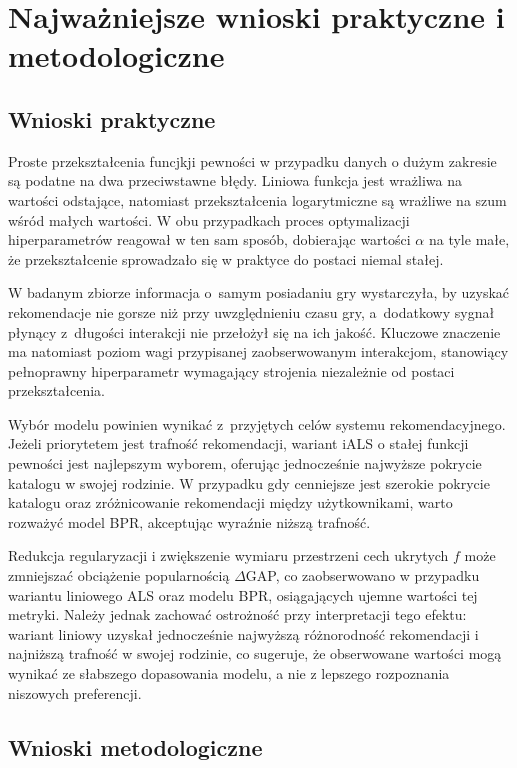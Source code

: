 \section{Najważniejsze wnioski praktyczne i metodologiczne}

\subsection{Wnioski praktyczne}

Proste przekształcenia funcjkji pewności w przypadku danych o dużym zakresie są podatne na dwa przeciwstawne błędy. Liniowa funkcja jest wrażliwa na wartości odstające, natomiast przekształcenia logarytmiczne są wrażliwe na szum wśród małych wartości. W obu przypadkach proces optymalizacji hiperparametrów reagował w ten sam sposób, dobierając wartości $\alpha$ na tyle małe, że przekształcenie sprowadzało się w praktyce do postaci niemal stałej.

W badanym zbiorze informacja o~samym posiadaniu gry wystarczyła, by uzyskać rekomendacje nie gorsze niż przy uwzględnieniu czasu gry, a~dodatkowy sygnał płynący z~długości interakcji nie przełożył się na ich jakość. Kluczowe znaczenie ma natomiast poziom wagi przypisanej zaobserwowanym interakcjom, stanowiący pełnoprawny hiperparametr wymagający strojenia niezależnie od postaci przekształcenia.

Wybór modelu powinien wynikać z~przyjętych celów systemu rekomendacyjnego. Jeżeli priorytetem jest trafność rekomendacji, wariant iALS o stałej funkcji pewności jest najlepszym wyborem, oferując jednocześnie najwyższe pokrycie katalogu w swojej rodzinie. W przypadku gdy cenniejsze jest szerokie pokrycie katalogu oraz zróżnicowanie rekomendacji między użytkownikami, warto rozważyć model BPR, akceptując wyraźnie niższą trafność.

Redukcja regularyzacji i zwiększenie wymiaru przestrzeni cech ukrytych $f$ może zmniejszać obciążenie popularnością $\Delta$GAP, co zaobserwowano w przypadku wariantu liniowego ALS oraz modelu BPR, osiągających ujemne wartości tej metryki. Należy jednak zachować ostrożność przy interpretacji tego efektu: wariant liniowy uzyskał jednocześnie najwyższą różnorodność rekomendacji i najniższą trafność w swojej rodzinie, co sugeruje, że obserwowane wartości mogą wynikać ze słabszego dopasowania modelu, a nie z lepszego rozpoznania niszowych preferencji.

\subsection{Wnioski metodologiczne}

